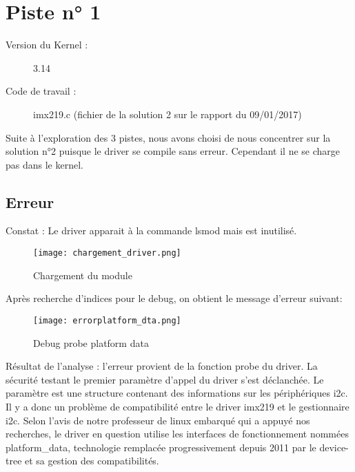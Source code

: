 \chapter{Piste n° 1} %
\label{Chapter2} %

\begin{description}
  \item[Version du Kernel :] 3.14
  \item[Code de travail :] imx219.c (fichier de la solution 2 sur le rapport du
  09/01/2017)
\end{description}

Suite à l'exploration des 3 pistes, nous avons choisi de nous
concentrer sur la solution n°2 puisque le driver se compile sans erreur. Cependant
il ne se charge pas dans le kernel.

\section{Erreur}
Constat : Le driver apparait à la commande lsmod mais est inutilisé.

 \begin{figure}[th]
   \centering
   \texttt{[image: chargement\_driver.png]}
   \decoRule
   \caption{Chargement du module}  \label{fig:Chargement-du-module}
\end{figure}

Après recherche d'indices pour le debug, on obtient le message d'erreur suivant:
\begin{figure}[th]
  \centering
  \texttt{[image: errorplatform\_dta.png]}
  \decoRule
  \caption{Debug probe platform data}  \label{fig:Debug-probe-platform-data}
\end{figure}

Résultat de l'analyse :
l'erreur provient de la fonction probe du driver. La
sécurité testant le premier paramètre d'appel du driver s'est déclanchée. Le
paramètre est une structure contenant des informations sur les périphériques i2c.
Il y a donc un problème de compatibilité entre le driver imx219 et le gestionnaire i2c. Selon
l'avis de notre professeur de linux embarqué qui a appuyé nos recherches,
le driver en question utilise les interfaces de fonctionnement nommées
platform\_data, technologie remplacée progressivement depuis 2011 par le
device-tree et sa gestion des compatibilités.

